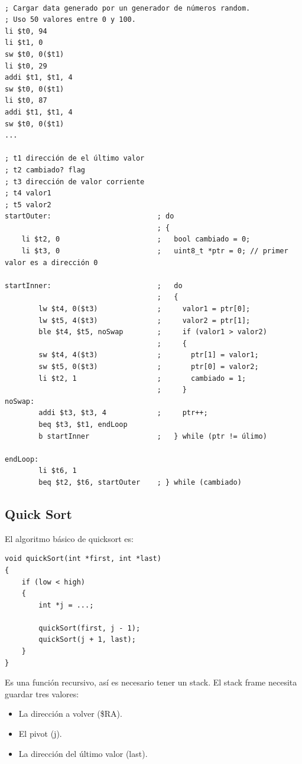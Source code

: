 \documentclass[a4paper]{article}
\begin{document}
\begin{verbatim}

; Cargar data generado por un generador de números random.
; Uso 50 valores entre 0 y 100.
li $t0, 94
li $t1, 0
sw $t0, 0($t1)
li $t0, 29
addi $t1, $t1, 4
sw $t0, 0($t1)
li $t0, 87
addi $t1, $t1, 4
sw $t0, 0($t1)
...

; t1 dirección de el último valor
; t2 cambiado? flag
; t3 dirección de valor corriente
; t4 valor1
; t5 valor2
startOuter:                         ; do
                                    ; {
    li $t2, 0                       ;   bool cambiado = 0;
    li $t3, 0                       ;   uint8_t *ptr = 0; // primer valor es a dirección 0

startInner:                         ;   do
                                    ;   {
        lw $t4, 0($t3)              ;     valor1 = ptr[0];
        lw $t5, 4($t3)              ;     valor2 = ptr[1];
        ble $t4, $t5, noSwap        ;     if (valor1 > valor2)
                                    ;     {
        sw $t4, 4($t3)              ;       ptr[1] = valor1;
        sw $t5, 0($t3)              ;       ptr[0] = valor2;
        li $t2, 1                   ;       cambiado = 1;
                                    ;     }
noSwap:
        addi $t3, $t3, 4            ;     ptr++;
        beq $t3, $t1, endLoop
        b startInner                ;   } while (ptr != úlimo)

endLoop:
        li $t6, 1
        beq $t2, $t6, startOuter    ; } while (cambiado)
\end{verbatim}

\subsection{Quick Sort}

El algoritmo básico de quicksort es:

\begin{verbatim}
void quickSort(int *first, int *last)
{
    if (low < high)
    {
        int *j = ...;

        quickSort(first, j - 1);
        quickSort(j + 1, last);
    }
}
\end{verbatim}

Es una función recursivo, así es necesario tener un stack. El stack frame necesita guardar tres valores:

\begin{itemize}
    \item La dirección a volver (\$RA).
    \item El pivot (j).
    \item La dirección del último valor (last).
\end{itemize}
\end{document}
